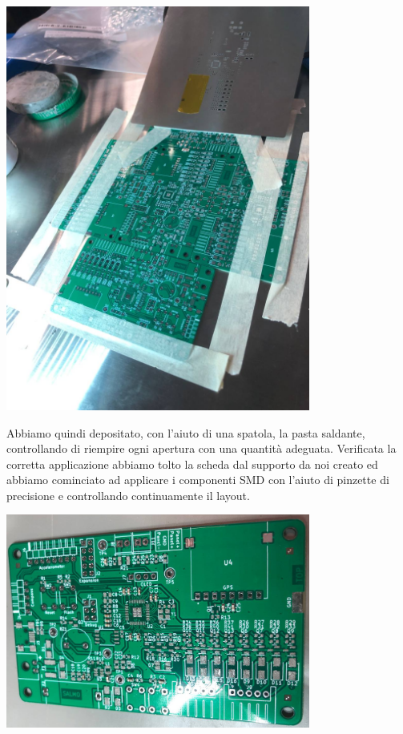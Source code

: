 \begin{center}
    \includegraphics[width=10cm]{figures/image106.jpg}
    \captionsetup{type=figure}
\end{center}

\noindent Abbiamo quindi depositato, con l’aiuto di una spatola, la pasta saldante, controllando di riempire ogni apertura con una quantità adeguata. Verificata la corretta applicazione abbiamo tolto la scheda dal supporto da noi creato ed abbiamo cominciato ad applicare i componenti SMD con l’aiuto di pinzette di precisione e controllando continuamente il layout.

\begin{center}
\includegraphics[width=10cm]{figures/image107.jpg}
\captionsetup{type=figure}
\end{center}


